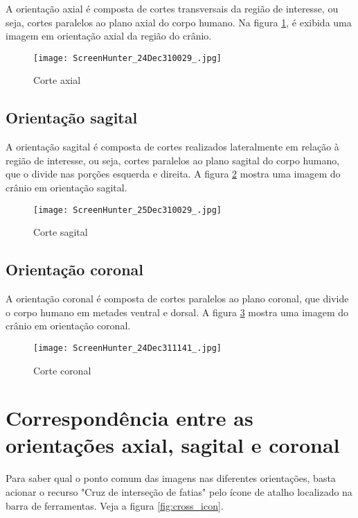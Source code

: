 A orientação axial é composta de cortes transversais da região
de interesse, ou seja, cortes paralelos ao plano axial do corpo humano.
Na figura \ref{fig:axial_corte}, é exibida uma imagem em orientação axial da
região do crânio.

\begin{figure}[!htb]
\centering
\texttt{[image: ScreenHunter\_24Dec310029\_.jpg]}
\caption{Corte axial}
\label{fig:axial_corte}
\end{figure}

\subsection{Orientação sagital}

A orientação sagital é composta de cortes realizados lateralmente
em relação à região de interesse, ou seja, cortes paralelos ao plano sagital do corpo humano,
que o divide nas porções esquerda e direita.
A figura \ref{fig:sagital_slice} mostra uma imagem do crânio em orientação sagital.

\begin{figure}[!htb]
\centering
\texttt{[image: ScreenHunter\_25Dec310029\_.jpg]}
\caption{Corte sagital}
\label{fig:sagital_slice}
\end{figure}

\newpage

\subsection{Orientação coronal}

A orientação coronal é composta de cortes paralelos ao plano coronal,
que divide o corpo humano em metades ventral e dorsal.
A figura \ref{fig:coronal_slice} mostra uma imagem do crânio em orientação
coronal.

\begin{figure}[!htb]
\centering
\texttt{[image: ScreenHunter\_24Dec311141\_.jpg]}
\caption{Corte coronal}
\label{fig:coronal_slice}
\end{figure}


\section{Correspondência entre as orientações axial, sagital e coronal}

Para saber qual o ponto comum das imagens nas diferentes orientações, basta acionar o
recurso "Cruz de interseção de fatias" pelo ícone de atalho localizado na barra de ferramentas.
Veja a figura \ref{fig:cross_icon}.

